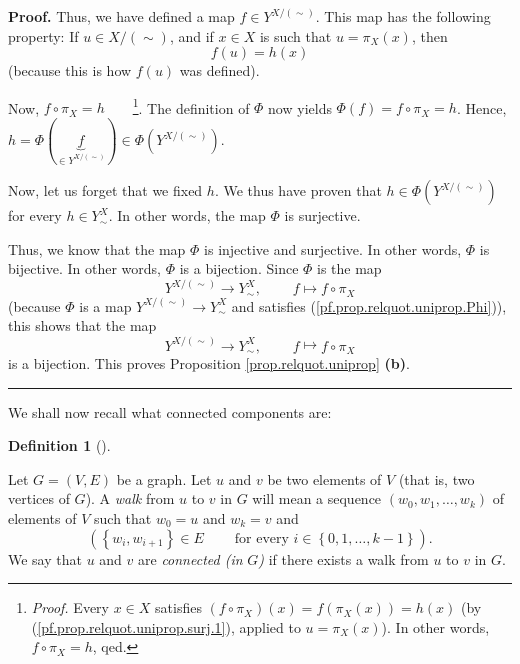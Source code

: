 \documentclass[numbers=enddot,12pt,final,onecolumn,notitlepage]{scrartcl}%
\theoremstyle{definition}
\newtheorem{defi}[theo]{Definition}
\newenvironment{definition}[1][]
{\begin{defi}[#1]\begin{leftbar}}
{\end{leftbar}\end{defi}}
\newenvironment{proof}[1][Proof]{\noindent\textbf{#1.} }{\ \rule{0.5em}{0.5em}}
\newenvironment{verlong}{}{}
\begin{document}
\begin{verlong}
\begin{proof}
Thus, we have defined a map $f\in Y^{X/\left(  \sim\right)  }$. This map has
the following property: If $u\in X/\left(  \sim\right)  $, and if $x\in X$ is
such that $u=\pi_{X}\left(  x\right)  $, then%
\begin{equation}
f\left(  u\right)  =h\left(  x\right)  \label{pf.prop.relquot.uniprop.surj.1}%
\end{equation}
(because this is how $f\left(  u\right)  $ was defined).

Now, $f\circ\pi_{X}=h$\ \ \ \ \footnote{\textit{Proof.} Every $x\in X$
satisfies $\left(  f\circ\pi_{X}\right)  \left(  x\right)  =f\left(  \pi
_{X}\left(  x\right)  \right)  =h\left(  x\right)  $ (by
(\ref{pf.prop.relquot.uniprop.surj.1}), applied to $u=\pi_{X}\left(  x\right)
$). In other words, $f\circ\pi_{X}=h$, qed.}. The definition of $\Phi$ now
yields $\Phi\left(  f\right)  =f\circ\pi_{X}=h$. Hence, $h=\Phi\left(
\underbrace{f}_{\in Y^{X/\left(  \sim\right)  }}\right)  \in\Phi\left(
Y^{X/\left(  \sim\right)  }\right)  $.

Now, let us forget that we fixed $h$. We thus have proven that $h\in
\Phi\left(  Y^{X/\left(  \sim\right)  }\right)  $ for every $h\in Y_{\sim}%
^{X}$. In other words, the map $\Phi$ is surjective.

Thus, we know that the map $\Phi$ is injective and surjective. In other words,
$\Phi$ is bijective. In other words, $\Phi$ is a bijection. Since $\Phi$ is
the map
\[
Y^{X/\left(  \sim\right)  }\rightarrow Y_{\sim}^{X}%
,\ \ \ \ \ \ \ \ \ \ f\mapsto f\circ\pi_{X}%
\]
(because $\Phi$ is a map $Y^{X/\left(  \sim\right)  }\rightarrow Y_{\sim}^{X}$
and satisfies (\ref{pf.prop.relquot.uniprop.Phi})), this shows that the map
\[
Y^{X/\left(  \sim\right)  }\rightarrow Y_{\sim}^{X}%
,\ \ \ \ \ \ \ \ \ \ f\mapsto f\circ\pi_{X}%
\]
is a bijection. This proves Proposition \ref{prop.relquot.uniprop}
\textbf{(b)}.
\end{proof}

We shall now recall what connected components are:
\end{verlong}

\begin{definition}
\label{def.walk}Let $G=\left(  V,E\right)  $ be a graph. Let $u$ and $v$ be
two elements of $V$ (that is, two vertices of $G$). A \emph{walk} from $u$ to
$v$ in $G$ will mean a sequence $\left(  w_{0},w_{1},\ldots,w_{k}\right)  $ of
elements of $V$ such that $w_{0}=u$ and $w_{k}=v$ and%
\[
\left(  \left\{  w_{i},w_{i+1}\right\}  \in E\ \ \ \ \ \ \ \ \ \ \text{for
every }i\in\left\{  0,1,\ldots,k-1\right\}  \right)  .
\]
We say that $u$ and $v$ are \emph{connected (in }$G$\emph{)} if there exists a
walk from $u$ to $v$ in $G$.
\end{definition}
\end{document}
